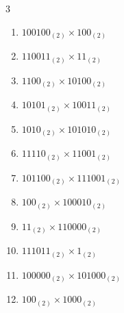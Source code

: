 \begin{multicols}{3}
\begin{enumerate}

\columnbreak %

\resetques

  \item $100100_{(2)} \times 100_{(2)}$


  \item $110011_{(2)} \times 11_{(2)}$


  \item $1100_{(2)} \times 10100_{(2)}$


  \item $10101_{(2)} \times 10011_{(2)}$


  \item $1010_{(2)} \times 101010_{(2)}$


\columnbreak %

  \item $11110_{(2)} \times 11001_{(2)}$


  \item $101100_{(2)} \times 111001_{(2)}$


  \item $100_{(2)} \times 100010_{(2)}$


  \item $11_{(2)} \times 110000_{(2)}$


  \item $111011_{(2)} \times 1_{(2)}$


\columnbreak %

  \item $100000_{(2)} \times 101000_{(2)}$


  \item $100_{(2)} \times 1000_{(2)}$


\end{enumerate}
\end{multicols}
